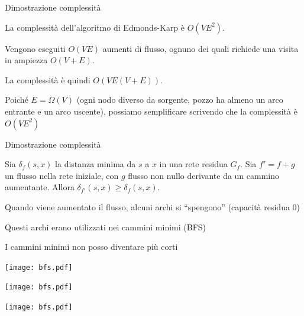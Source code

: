 \begin{frame}{Dimostrazione complessità}

\vspace{-9pt}
\begin{myboxtitle}[Teorema]
La complessità dell'algoritmo di Edmonds-Karp è $O(VE^2)$.
\end{myboxtitle}
\BIL
\item Vengono eseguiti $O(VE)$ aumenti di flusso, ognuno dei quali richiede
una visita in ampiezza $O(V+E)$.
\item La complessità è quindi $O(VE(V+E))$.
\item Poiché $E = \Omega(V)$ (ogni nodo diverso da sorgente, pozzo ha almeno un arco entrante e un arco uscente), possiamo semplificare scrivendo che la complessità è $O(VE^2)$
\EIL


\end{frame}

\begin{frame}{Dimostrazione complessità}

\vspace{-9pt}
\begin{myboxtitle}
Sia $\delta_f(s,x)$ la distanza minima da $s$ a $x$ in una rete residua $G_f$.
Sia $f' = f+g$ un flusso nella rete iniziale, con $g$ flusso non nullo derivante
da un cammino aumentante. Allora $\delta_{f'}(s,x) \geq \delta_f(s,x)$.
\end{myboxtitle}  
\BI
  \item Quando viene aumentato il flusso, alcuni archi si  ``spengono'' (capacità residua 0)
  \item Questi archi erano utilizzati nei cammini minimi (BFS)
  \item I cammini minimi non posso diventare più corti
\EI

\begin{overprint}
\begin{center}
\texttt{[image: bfs.pdf]}
\end{center}
\begin{center}
\texttt{[image: bfs.pdf]}
\end{center}
\begin{center}
\texttt{[image: bfs.pdf]}
\end{center}
\end{overprint}

\end{frame}

